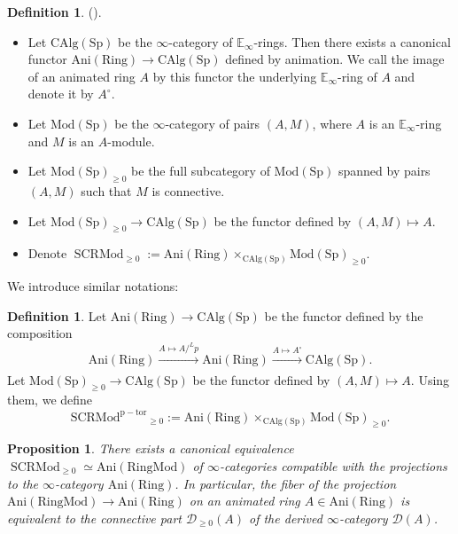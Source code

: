 \documentclass[11pt, a4paper]{amsart}
\theoremstyle{plain}
\newtheorem{prop}[theorem]{Proposition}
\theoremstyle{definition}
\newtheorem{definition}[theorem]{Definition}
\begin{document}
\begin{definition}\label{def3.16}(\cite[Notation 25.2.1.1]{Lur18}).
    \begin{itemize}
         
        \item Let $\operatorname{CAlg(Sp)}$ be the $\infty$-category of $\mathbb E_{\infty}$-rings. Then there exists a canonical functor $\operatorname{Ani(Ring)}\to \operatorname{CAlg(Sp)}$ defined by animation. We call the image of an animated ring $A$ by this functor the underlying $\mathbb E_{\infty}$-ring of $A$ and denote it by $A^{\circ}$.
        \item Let $\operatorname{Mod(Sp)}$ be the $\infty$-category of pairs $(A,M)$, where $A$ is an $\mathbb E_{\infty}$-ring and $M$ is an $A$-module.
        \item Let $\operatorname{Mod(Sp)}_{\ge0}$ be the full subcategory of $\operatorname{Mod(Sp)}$ spanned by pairs $(A,M)$ such that $M$ is connective.
        \item Let $\operatorname{Mod(Sp)}_{\ge0}\to \operatorname{CAlg(Sp)}$ be the functor defined by $(A,M)\mapsto A$.
        \item Denote $\operatorname{SCRMod}_{\ge0}:=\operatorname{Ani(Ring)}\times_{\operatorname{CAlg(Sp)}}\operatorname{Mod(Sp)}_{\ge0}$.
    \end{itemize}
\end{definition}
We introduce similar notations:
\begin{definition}\label{def3.17}
    Let $\operatorname{Ani(Ring)}\to \operatorname{CAlg(Sp)}$ be the functor defined by the composition \[\operatorname{Ani(Ring)}\xrightarrow[]{A\mapsto A/^Lp}\operatorname{Ani(Ring)}\xrightarrow[]{A\mapsto A^{\circ}}\operatorname{CAlg(Sp)}.\]
    Let $\operatorname{Mod(Sp)}_{\ge0}\to \operatorname{CAlg(Sp)}$ be the functor defined by $(A,M)\mapsto A$. Using them, we define \[\operatorname{SCRMod^{p-tor}}_{\ge0}:=\operatorname{Ani(Ring)}\times_{\operatorname{CAlg(Sp)}}\operatorname{Mod(Sp)}_{\ge0}.\]
\end{definition}
\begin{prop}\label{pro3.18}
    There exists a canonical equivalence $\operatorname{SCRMod}_{\ge0}\simeq \operatorname{Ani(RingMod)}$ of $\infty$-categories compatible with the projections to the $\infty$-category $\operatorname{Ani(Ring)}$. In particular, the fiber of the projection $\operatorname{Ani(RingMod)}\to \operatorname{Ani(Ring)}$ on an animated ring $A\in \operatorname{Ani(Ring)}$ is equivalent to the connective part $\mathcal D_{\ge0}(A)$ of the derived $\infty$-category $\mathcal D(A)$.
\end{prop}
\end{document}
